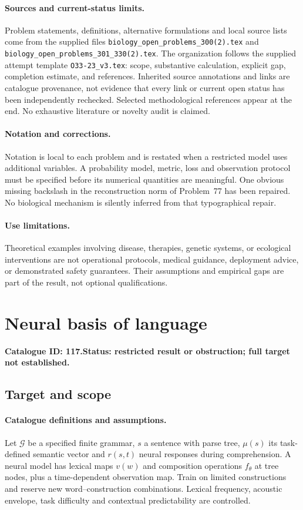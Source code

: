 \documentclass[11pt]{article}
\begin{document}
\paragraph{Sources and current-status limits.}
Problem statements, definitions, alternative formulations and local source lists
come from the supplied files
\texttt{biology\_open\_problems\_300(2).tex} and
\texttt{biology\_open\_problems\_301\_330(2).tex}.
The organization follows the supplied attempt template
\texttt{O33-23\_v3.tex}: scope, substantive calculation, explicit gap,
completion estimate, and references. Inherited source annotations and links are
catalogue provenance, not evidence that every link or current open status has
been independently rechecked. Selected methodological references appear at the
end. No exhaustive literature or novelty audit is claimed.

\paragraph{Notation and corrections.}
Notation is local to each problem and is restated when a restricted model uses
additional variables. A probability model, metric, loss and observation protocol
must be specified before its numerical quantities are meaningful. One obvious
missing backslash in the reconstruction norm of Problem~77 has been repaired.
No biological mechanism is silently inferred from that typographical repair.

\paragraph{Use limitations.}
Theoretical examples involving disease, therapies, genetic systems, or ecological
interventions are not operational protocols, medical guidance, deployment advice,
or demonstrated safety guarantees. Their assumptions and empirical gaps are part
of the result, not optional qualifications.

\setcounter{section}{116}
\section{Neural basis of language}
\label{prob:117}
\noindent\textbf{Catalogue ID: 117.}\quad \textbf{Status: restricted result or obstruction; full target not established.}
\subsection{Target and scope}
\paragraph{Catalogue definitions and assumptions.}
Let $\mathcal G$ be a specified finite grammar, $s$ a sentence with parse tree, $\mu(s)$ its task-defined semantic vector and $r(s,t)$ neural responses during comprehension. A neural model has lexical maps $v(w)$ and composition operations $f_\theta$ at tree nodes, plus a time-dependent observation map. Train on limited constructions and reserve new word--construction combinations. Lexical frequency, acoustic envelope, task difficulty and contextual predictability are controlled.
\end{document}
